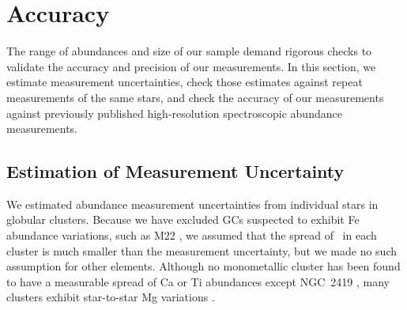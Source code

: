 \documentclass{emulateapj}
\begin{document}



\section{Accuracy}
\label{sec:accuracy}

The range of abundances and size of our sample demand rigorous checks
to validate the accuracy and precision of our measurements.  In this
section, we estimate measurement uncertainties, check those estimates
against repeat measurements of the same stars, and check the accuracy
of our measurements against previously published high-resolution
spectroscopic abundance measurements.

\subsection{Estimation of Measurement Uncertainty}
\label{sec:error}

We estimated abundance measurement uncertainties from individual stars
in globular clusters.  Because we have excluded GCs suspected to
exhibit Fe abundance variations, such as M22 \citep{dac09,mar09}, we
assumed that the spread of \feh\ in each cluster is much smaller than
the measurement uncertainty, but we made no such assumption for other
elements.  Although no monometallic cluster has been found to have a
measurable spread of Ca or Ti abundances except NGC~2419
\citep{cohetal10}, many clusters exhibit star-to-star Mg variations
\citep[see the review by][]{gra04}.
\end{document}
